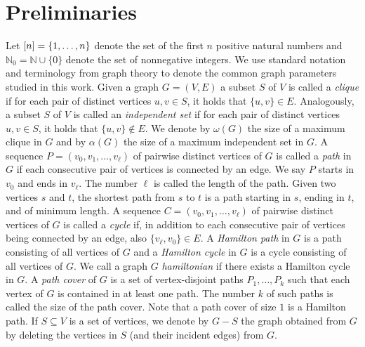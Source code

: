 \section{Preliminaries}
\label{sec:prelim}
Let $[n] = \{ 1, \ldots, n \}$ denote the set of the first $n$ positive natural numbers and $\mathbb{N}_0 = \mathbb{N} \cup \{ 0 \}$ denote the set of nonnegative integers. We use standard notation and terminology from graph theory to denote 
the common graph parameters studied in this work. 
Given a graph $G = (V,E)$ a  subset $S$ of $V$ is called a \emph{clique} if 
for each pair of distinct vertices $u,v \in S$, it holds that $\{u,v\} \in E$.
Analogously, a subset $S$ of $V$ is called an \emph{independent set} if for each pair 
of distinct vertices $u,v \in S$, it holds that $\{u,v\} \notin E$.  We denote by $\omega(G)$ the size of a maximum 
clique in $G$ and by $\alpha(G)$ the size of a maximum independent set in $G$.
A sequence $P = (v_0, v_1, \dots, v_{\ell})$ of pairwise distinct vertices of $G$ is called a \emph{path} in $G$ 
if each consecutive pair of vertices is connected by an edge.
We say $P$ starts in $v_0$ and ends in $v_{\ell}$. The number $\ell$ is called the length of the path. Given two vertices $s$ and $t$, 
the shortest path from $s$ to $t$ is a path starting in $s$, ending in $t$, and
of minimum length.
A sequence $C = (v_0, v_1, \dots, v_{\ell})$ of pairwise distinct vertices of $G$
is called a \emph{cycle} if, in addition to each consecutive pair of vertices being connected by an edge, 
also $\{v_{\ell}, v_0\} \in E$. A \emph{Hamilton path} in $G$ is a path consisting of all vertices of $G$
and a \emph{Hamilton cycle} in $G$ is a cycle consisting of all vertices of $G$. We 
call a graph $G$ \emph{hamiltonian} if there exists a Hamilton cycle in $G$.
A \emph{path cover} of $G$ is a set of vertex-disjoint paths $P_1, \dots, P_k$ 
such that each vertex of $G$ is contained in at least one path. The number $k$ of 
such paths is called the size of the path cover. Note that a path cover of size $1$ 
is a Hamilton path. If $S \subseteq V$ is a set of vertices, we denote by $G-S$ the graph obtained from $G$
by deleting the vertices in $S$ (and their incident edges) from $G$.

